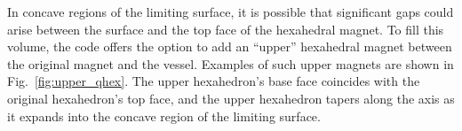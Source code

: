 \documentclass[11pt,onecolumn]{article}
\begin{document}
In concave regions of the limiting surface, it is possible that significant
gaps could arise between the surface and the top face of the hexahedral
magnet. To fill this volume, the code offers the option to add an 
``upper'' hexahedral magnet between the original magnet and the vessel.
Examples of such upper magnets are shown in Fig.~\ref{fig:upper_qhex}.
The upper hexahedron's base face coincides with the original hexahedron's 
top face, and the upper hexahedron tapers along the axis as it expands into
the concave region of the limiting surface.



\end{document}
